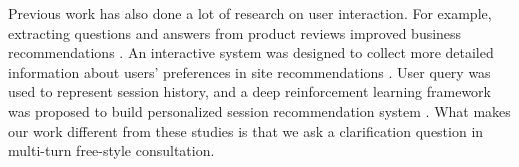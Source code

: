 Previous work has also done a lot of research on user interaction. 
For example, extracting questions and answers from product reviews improved business recommendations \cite{DBLP:conf/cikm/ZhangCA0C18}. 
An interactive system was designed to collect more detailed information about users' preferences in site recommendations \cite{DBLP:conf/kdd/Christakopoulou16}. 
User query was used to represent session history, and a deep reinforcement learning framework was proposed to build personalized session recommendation system \cite{DBLP:conf/sigir/SunZ18}.
What makes our work different from these studies is that we ask a clarification question in multi-turn free-style consultation.
